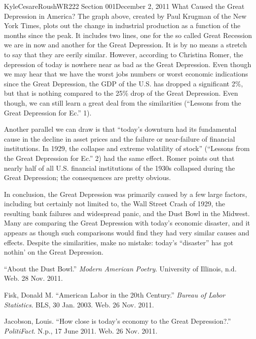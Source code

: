 \documentclass[12pt,letterpaper]{article}
\begin{document}
\begin{mla}{Kyle}{Cesare}{Roush}{WR222 Section 001}{December 2, 2011}{
What Caused the Great Depression in America?}
The graph above, created by Paul Krugman of the New York Times, plots out the
change in industrial production as a function of the months since the peak.  It
includes two lines, one for the so called Great Recession we are in now and
another for the Great Depression.  It is by no means a stretch to say that they
are eerily similar.  However, according to Christina Romer, the depression of
today is nowhere near as bad as the Great Depression.  Even though we may hear
that we have the worst jobs numbers or worst economic indications since the
Great Depression, the GDP of the U.S. has dropped a significant 2\%, but that is
nothing compared to the 25\% drop of the Great Depression.  Even though, we can
still learn a great deal from the similarities (``Lessons from the Great
Depression for Ec.'' 1).

Another parallel we can draw is that ``today's downturn had its fundamental
cause in the decline in asset prices and the failure or near-failure of
financial institutions.  In 1929, the collapse and extreme volatility of stock''
(``Lessons from the Great Depression for Ec.'' 2) had the same effect.  Romer
points out that nearly half of all U.S. financial institutions of the 1930s
collapsed during the Great Depression; the consequences are pretty obvious.

In conclusion, the Great Depression was primarily caused by a few large factors,
including but certainly not limited to, the Wall Street Crash of 1929, the
resulting bank failures and widespread panic, and the Dust Bowl in the Midwest.
Many are comparing the Great Depression with today's economic disaster, and it
appears as though such comparisons would find they had very similar causes and
effects.  Despite the similarities, make no mistake: today's ``disaster'' has
got nothin' on the Great Depression.

\begin{workscited}


\bibent ``About the Dust Bowl.'' \emph{Modern American Poetry}. University of
Illinois, n.d. Web. 28 Nov. 2011.

\bibent Fisk, Donald M. ``American Labor in the 20th Century.'' \emph{Bureau of
Labor Statistics}. BLS, 30 Jan. 2003. Web. 26 Nov. 2011.

\bibent Jacobson, Louis. ``How close is today's economy to the Great
Depression?.'' \emph{PolitiFact}. N.p., 17 June 2011. Web. 26 Nov. 2011.


\end{workscited}
\end{mla}
\end{document}
